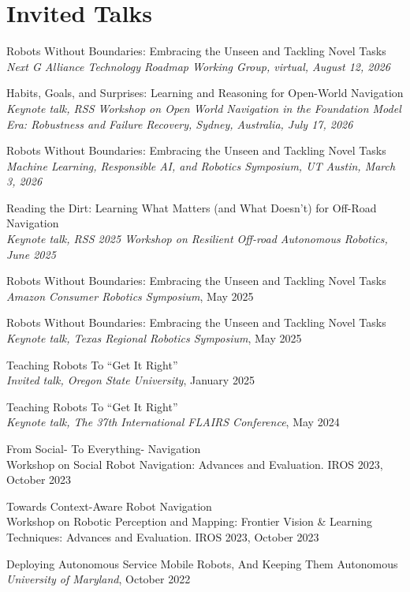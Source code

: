 \documentclass[Times]{article}
\begin{document}
\section*{Invited Talks}
\begingroup
{}

Robots Without Boundaries: Embracing the Unseen and Tackling Novel Tasks\\
{\em Next G Alliance Technology Roadmap Working Group, virtual, August 12, 2026}

Habits, Goals, and Surprises: Learning and Reasoning for Open-World Navigation\\
{\em Keynote talk, RSS Workshop on Open World Navigation in the Foundation Model Era: Robustness and Failure Recovery, Sydney, Australia, July 17, 2026}

Robots Without Boundaries: Embracing the Unseen and Tackling Novel Tasks\\
{\em Machine Learning, Responsible AI, and Robotics Symposium, UT Austin, March 3, 2026}

Reading the Dirt: Learning What Matters (and What Doesn't) for Off-Road
Navigation\\
{\em Keynote talk, RSS 2025 Workshop on Resilient Off-road Autonomous Robotics, June 2025}

Robots Without Boundaries: Embracing the Unseen and Tackling Novel Tasks\\
{\em Amazon Consumer Robotics Symposium}, May 2025

Robots Without Boundaries: Embracing the Unseen and Tackling Novel Tasks\\
{\em Keynote talk,  Texas Regional Robotics Symposium}, May 2025

Teaching Robots To ``Get It Right''\\
{\em Invited talk, Oregon State University}, January 2025

Teaching Robots To ``Get It Right''\\
{\em Keynote talk, The 37th  International FLAIRS Conference}, May 2024

From Social- To Everything- Navigation
\\
{Workshop on Social Robot Navigation: Advances and Evaluation. IROS 2023},
October 2023


Towards Context-Aware Robot Navigation
\\
{Workshop on Robotic Perception and Mapping: Frontier Vision \& Learning Techniques: Advances and Evaluation. IROS 2023},
October 2023


Deploying Autonomous Service Mobile Robots, And Keeping Them Autonomous
\\
{\em University of Maryland}, October 2022
\end{document}
